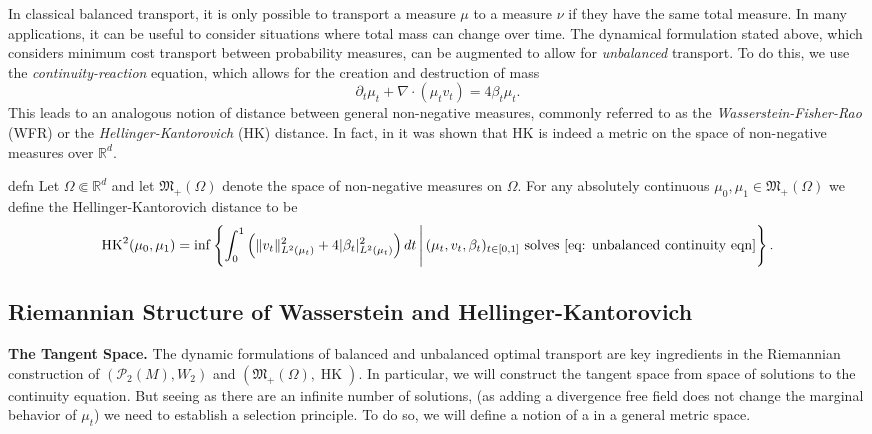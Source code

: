 \documentclass[11pt]{article}
\newcommand{\man}{M}
\newcommand{\HK}{\operatorname{HK}}
\begin{document}
In classical balanced transport, it is only possible to transport a measure $\mu$ to a measure $\nu$ if they have the same total measure. In many applications, it can be useful to consider situations where total mass can change over time. The dynamical formulation stated above, which considers minimum cost transport between probability measures, can be augmented to allow for \textit{unbalanced} transport. To do this, we use the \textit{continuity-reaction} equation, which allows for the creation and destruction of mass
\begin{equation}
    \partial_t\mu_t + \nabla \cdot (\mu_tv_t) = 4\beta_t\mu_t. \label{eq: unbalanced continuity eqn}
\end{equation}
This leads to an analogous notion of distance between general non-negative measures, commonly referred to as the \textit{Wasserstein-Fisher-Rao} (WFR) or the \textit{Hellinger-Kantorovich} (HK) distance. In fact, in \citet{liero2018optimal} it was shown that HK is indeed a metric on the space of non-negative measures over $\mathbb{R}^d$. 

\begin{restatable}{defn}{}
    Let $\Omega\Subset \mathbb{R}^d$ and let $\mathfrak{M}_+(\Omega)$ denote the space of non-negative measures on $\Omega$. For any absolutely continuous $\mu_0, \mu_1 \in \mathfrak{M}_+(\Omega)$ we define the Hellinger-Kantorovich distance to be
    \begin{equation}
        \HK^2(\mu_0, \mu_1) = \inf\left\{\int_0^1 \left(\|v_t\|_{L^2(\mu_t)}^2 + 4|\beta_t|_{L^2(\mu_t)}^2\right)dt \, \Bigg| \, (\mu_t, v_t,  \beta_t)_{t\in [0,1]} \text{ solves \cref{eq: unbalanced continuity eqn}}\right\}.
    \end{equation}
\end{restatable}

\subsection{Riemannian Structure of Wasserstein and Hellinger-Kantorovich}

\noindent \textbf{The Tangent Space.} The dynamic formulations of balanced and unbalanced optimal transport are key ingredients in the Riemannian construction of $(\mathcal{P}_2(\man), W_2)$ and $(\mathfrak{M}_+(\Omega), \HK)$. In particular, we will construct the tangent space from space of solutions to the continuity equation. But seeing as there are an infinite number of solutions, (as adding a divergence free field does not change the marginal behavior of $\mu_t$) we need to establish a selection principle. To do so, we will define a notion of a  in a general metric space.
\end{document}
